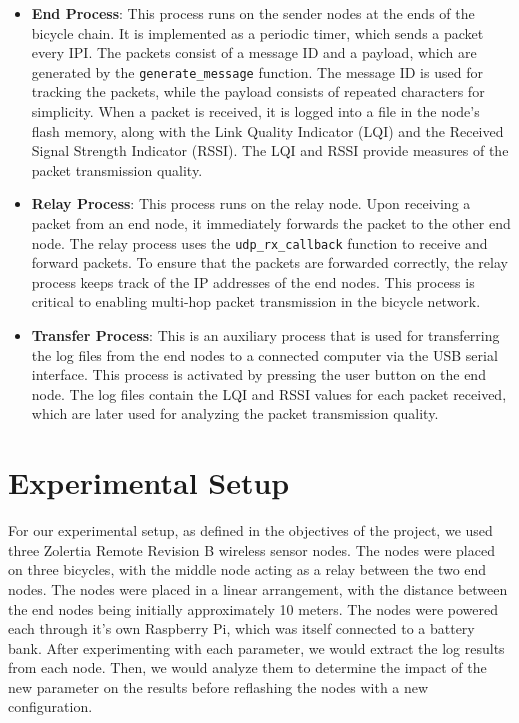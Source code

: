 \documentclass[runningheads]{llncs}
\begin{document}
\begin{itemize}
    \item \textbf{End Process}: This process runs on the sender nodes at the ends of the bicycle chain. It is implemented as a periodic timer, which sends a packet every IPI. The packets consist of a message ID and a payload, which are generated by the \texttt{generate\_message} function. The message ID is used for tracking the packets, while the payload consists of repeated characters for simplicity. When a packet is received, it is logged into a file in the node's flash memory, along with the Link Quality Indicator (LQI) and the Received Signal Strength Indicator (RSSI). The LQI and RSSI provide measures of the packet transmission quality.
    \item \textbf{Relay Process}: This process runs on the relay node. Upon receiving a packet from an end node, it immediately forwards the packet to the other end node. The relay process uses the \texttt{udp\_rx\_callback} function to receive and forward packets. To ensure that the packets are forwarded correctly, the relay process keeps track of the IP addresses of the end nodes. This process is critical to enabling multi-hop packet transmission in the bicycle network.
    \item \textbf{Transfer Process}: This is an auxiliary process that is used for transferring the log files from the end nodes to a connected computer via the USB serial interface. This process is activated by pressing the user button on the end node. The log files contain the LQI and RSSI values for each packet received, which are later used for analyzing the packet transmission quality.
    \end{itemize}

    \clearpage
    

\section{Experimental Setup}

For our experimental setup, as defined in the objectives of the project, we used three Zolertia Remote Revision B wireless sensor nodes. The nodes were placed on three bicycles, with the middle node acting as a relay between the two end nodes. The nodes were placed in a linear arrangement, with the distance between the end nodes being initially approximately 10 meters.
The nodes were powered each through it's own Raspberry Pi, which was itself connected to a battery bank.
After experimenting with each parameter, we would extract the log results from each node. Then, we would analyze them to determine the impact of the new parameter on the results before reflashing the nodes with a new configuration.
\end{document}
